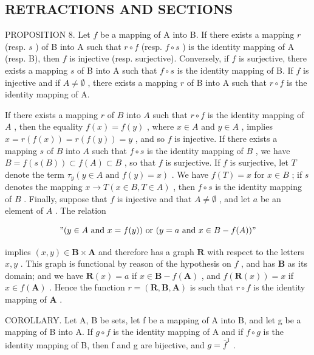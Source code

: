 \subsection{RETRACTIONS AND SECTIONS}

PROPOSITION 8. Let \(f\) be a mapping of A into B. If there exists a mapping \(r\) (resp. \(s\) ) of B into A such that \(r \circ f\) (resp. \(f \circ s\) ) is the identity mapping of A (resp. B), then \(f\) is injective (resp. surjective). Conversely, if \(f\) is surjective, there exists a mapping \(s\) of B into A such that \(f \circ s\) is the identity mapping of B. If \(f\) is injective and if \(A \neq \emptyset\) , there exists a mapping \(r\) of B into A such that \(r \circ f\) is the identity mapping of A.

If there exists a mapping \(r\) of \(B\) into \(A\) such that \(r \circ f\) is the identity mapping of \(A\) , then the equality \(f(x) = f(y)\) , where \(x \in A\) and \(y \in A\) , implies \(x = r(f(x)) = r(f(y)) = y\) , and so \(f\) is injective. If there exists a mapping \(s\) of \(B\) into \(A\) such that \(f \circ s\) is the identity mapping of \(B\) , we have \(B = f(s(B)) \subset f(A) \subset B\) , so that \(f\) is surjective. If \(f\) is surjective, let \(T\) denote the term \(\tau_y(y \in A \text{ and } f(y) = x)\) . We have \(f(T) = x\) for \(x \in B\) ; if \(s\) denotes the mapping \(x \to T (x \in B, T \in A)\) , then \(f \circ s\) is the identity mapping of \(B\) . Finally, suppose that \(f\) is injective and that \(A \neq \emptyset\) , and let \(a\) be an element of \(A\) . The relation

\[
" (y \in A \text {   and   } x = f (y)) \text {   or   } (y = a \text {   and   } x \in B - f (A))"
\]

implies \((x, y) \in \mathbf{B} \times \mathbf{A}\) and therefore has a graph \(\mathbf{R}\) with respect to the letters \(x, y\) . This graph is functional by reason of the hypothesis on \(f\) , and has \(\mathbf{B}\) as its domain; and we have \(\mathbf{R}(x) = a\) if \(x \in \mathbf{B} - f(\mathbf{A})\) , and \(f(\mathbf{R}(x)) = x\) if \(x \in f(\mathbf{A})\) . Hence the function \(r = (\mathbf{R}, \mathbf{B}, \mathbf{A})\) is such that \(r \circ f\) is the identity mapping of \(\mathbf{A}\) .

COROLLARY. Let A, B be sets, let f be a mapping of A into B, and let g be a mapping of B into A. If \(g \circ f\) is the identity mapping of A and if \(f \circ g\) is the identity mapping of B, then f and g are bijective, and \(g = \overline{f}^{1}\) .

